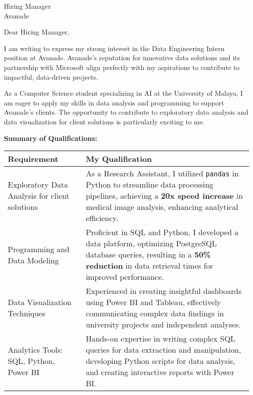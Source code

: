 \documentclass[11pt]{letter}
\date{\today}
\begin{document}
\begin{letter}{Hiring Manager\\
Avanade\\
 [Redacted due to privacy]}

\opening{Dear Hiring Manager,}

I am writing to express my strong interest in the Data Engineering Intern position at Avanade. Avanade's reputation for innovative data solutions and its partnership with Microsoft align perfectly with my aspirations to contribute to impactful, data-driven projects.

As a Computer Science student specializing in AI at the University of Malaya, I am eager to apply my skills in data analysis and programming to support Avanade's clients. The opportunity to contribute to exploratory data analysis and data visualization for client solutions is particularly exciting to me.

\vspace{0.2cm}
\textbf{Summary of Qualifications:}
\vspace{0.1cm}

\renewcommand{\arraystretch}{1.15}
{\small
\begin{tabularx}{\textwidth}{@{}p{}X@{}}
\textbf{Requirement} & \textbf{My Qualification} \\

\hline
Exploratory Data Analysis \newline for client solutions & As a Research Assistant, I utilized \texttt{pandas} in Python to streamline data processing pipelines, achieving a \textbf{20x speed increase} in medical image analysis, enhancing analytical efficiency. \\

Programming and Data Modeling & Proficient in SQL and Python, I developed a data platform, optimizing PostgreSQL database queries, resulting in a \textbf{50\% reduction} in data retrieval times for improved performance. \\

Data Visualization Techniques & Experienced in creating insightful dashboards using Power BI and Tableau, effectively communicating complex data findings in university projects and independent analyses. \\

Analytics Tools: SQL, Python, Power BI & Hands-on expertise in writing complex SQL queries for data extraction and manipulation, developing Python scripts for data analysis, and creating interactive reports with Power BI. \\


\end{tabularx}}
\end{letter}
\end{document}
